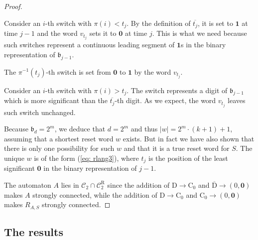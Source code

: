 \documentclass{ws-ijmpc}
\begin{document}
\begin{proof}
\begin{itemlist}
\begin{itemlist}
\item Consider an $i$-th switch with $\pi\!\left(i\right)<t_{j}$. By the
definition of $\overline{t_{j}}$, it is set to $\mathbf{1}$ at time
$j-1$ and the word $v_{t_{j}}$ sets it to $\mathbf{0}$ at time
$j$. This is what we need because such switches represent a continuous
leading segment of $\mathbf{1}$s in the binary representation of
$\mathfrak{b}_{j-1}$. 
\item The $\pi^{-1}\!\left(t_{j}\right)$-th switch is set from $\mathbf{0}$
to $\mathbf{1}$ by the word $v_{t_{j}}$.
\item Consider an $i$-th switch with $\pi\!\left(i\right)>t_{j}$. The
switch represents a digit of $\mathfrak{b}_{j-1}$ which is more significant
than the $\overline{t_{j}}$-th digit. As we expect, the word $v_{t_{j}}$
leaves such switch unchanged.
\end{itemlist}
\end{itemlist}
Because $\mathfrak{b}_{d}=2^{m}$, we deduce that $d=2^{m}$ and thus
$\left|w\right|=2^{m}\cdot\left(k+1\right)+1$, assuming that a shortest
reset word $w$ exists. But in fact we have also shown that there
is only one possibility for such $w$ and that it is a true reset
word for $S$. The unique $w$ is of the form (\ref{eq: rlang3}),
where $t_{j}$ is the position of the least significant \textbf{$\mathbf{0}$
}in the binary representation of $j-1$.

The automaton $A$ lies in $\mathcal{C}_{2}\cap\mathcal{C}_{2}^{\mathrm{R}}$
since the addition of $\mathrm{D}\longrightarrow\mathrm{C}_{0}$ and
$\overline{\mathrm{D}}\longrightarrow\left(0,\mathbf{0}\right)$ makes
$A$ strongly connected, while the addition of $\mathrm{D}\longrightarrow\mathrm{C}_{0}$
and $\mathrm{C}_{0}\longrightarrow\left(0,\mathbf{0}\right)$ makes
$R_{A,S}$ strongly connected.
\end{proof}

\subsection{The results}
\end{document}
